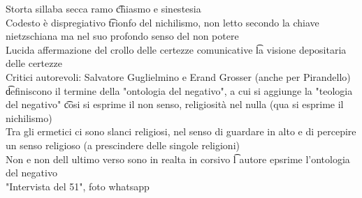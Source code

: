 \documentclass[12pt]{article}
\begin{document}
Storta sillaba secca ramo \t chiasmo e sinestesia \\
Codesto è dispregiativo \t trionfo del nichilismo, non letto secondo la chiave nietzschiana ma nel suo profondo senso del non potere \\
Lucida affermazione del crollo delle certezze comunicative \t la visione depositaria delle certezze \\
Critici autorevoli: Salvatore Guglielmino e Erand Grosser (anche per Pirandello) \t definiscono il termine della "ontologia del negativo", a cui si aggiunge la "teologia del negativo" \t cosi si esprime il non senso, religiosità nel nulla (qua si esprime il nichilismo) \\
Tra gli ermetici ci sono slanci religiosi, nel senso di guardare in alto e di percepire un senso religioso (a prescindere delle singole religioni) \\
Non e non dell ultimo verso sono in realta in corsivo \t l autore epsrime l'ontologia del negativo \\
"Intervista del 51", foto whatsapp
\end{document}
